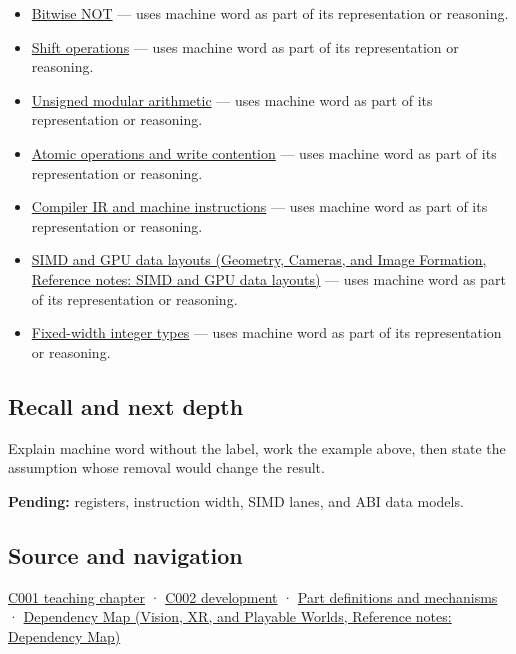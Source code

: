 \begin{itemize}
\tightlist
\item
  \hyperref[appendix-8f38927cfc54]{Bitwise NOT} --- uses machine word as part of its representation or reasoning.
\item
  \hyperref[appendix-73425b25118e]{Shift operations} --- uses machine word as part of its representation or reasoning.
\item
  \hyperref[appendix-c99977d88b33]{Unsigned modular arithmetic} --- uses machine word as part of its representation or reasoning.
\item
  \hyperref[appendix-e12d1b03fefb]{Atomic operations and write contention} --- uses machine word as part of its representation or reasoning.
\item
  \hyperref[appendix-942ad41afb30]{Compiler IR and machine instructions} --- uses machine word as part of its representation or reasoning.
\item
  \href{../03-Geometry-Cameras-and-Image-Formation/main.pdf\#nameddest=appendix-3c7b1a56de01}{SIMD and GPU data layouts (Geometry, Cameras, and Image Formation, Reference notes: SIMD and GPU data layouts)} --- uses machine word as part of its representation or reasoning.
\item
  \hyperref[appendix-cc04044b5782]{Fixed-width integer types} --- uses machine word as part of its representation or reasoning.
\end{itemize}

\subsection{Recall and next depth}\label{appendix-d67a19507dc5-recall-and-next-depth}

\hypertarget{appendix-d67a19507dc5-recall-and-next-depth}{}

Explain machine word without the label, work the example above, then state the assumption whose removal would change the result.

\textbf{Pending:} registers, instruction width, SIMD lanes, and ABI data models.

\subsection{Source and navigation}\label{appendix-d67a19507dc5-source-and-navigation}

\hypertarget{appendix-d67a19507dc5-source-and-navigation}{}

\hyperref[01-foundations-i-ch001-from-a-signal-to-an-interpretation]{C001 teaching chapter} · \hyperref[01-foundations-i-ch001-arithmetic-becomes-a-policy]{C002 development} · \hyperref[appendix-fd090d982a15]{Part definitions and mechanisms} · \href{../07-Vision-XR-and-Playable-Worlds/main.pdf\#nameddest=appendix-4ad47bdd269a}{Dependency Map (Vision, XR, and Playable Worlds, Reference notes: Dependency Map)}
